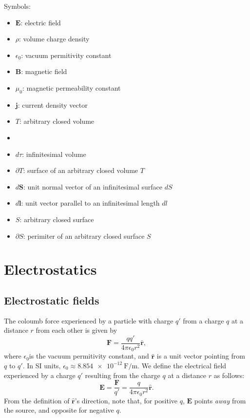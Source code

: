 \documentclass[a4paper, 12pt]{article}
\renewcommand{\vec}[1]{\mathbf{#1}}
\newcommand{\E}{\ensuremath{\vec{E}}}
\newcommand{\e}{\ensuremath{\epsilon_0}}
\renewcommand{\j}{\ensuremath{\vec{j}}}
\newcommand{\B}{\ensuremath{\vec{B}}}
\let\tmp\hat
\renewcommand{\hat}[1]{\vec{\tmp{#1}}}
\begin{document}
        Symbols:
        \begin{itemize}
            \setlength\itemsep{.1em}
            \item \E: electric field 
            \item $\rho$: volume charge density
            \item \e: vacuum permitivity constant
            \item \B: magnetic field
            \item $\mu_0$: magnetic permeability constant
            \item \j: current density vector
            \item $T$: arbitrary closed volume
            \item \item $d\tau$: infinitesimal volume
            \item $\partial T$: surface of an arbitrary closed volume $T$
            \item $d\vec{S}$: unit normal vector of an infinitesimal surface $dS$
            \item $d\vec{l}$: unit vector parallel to an infinitesimal length $dl$
            \item $S$: arbitrary closed surface
            \item $\partial S$: perimiter of an arbitrary closed surface $S$
        \end{itemize}


\section{Electrostatics}
\subsection{Electrostatic fields}
    The coloumb force experienced by a particle with charge $q'$ from a charge $q$ at a distance $r$ from each other is given by 
    \begin{equation}
        \vec{F} = \frac{qq'}{4\pi\e r^2}\hat{r},
    \end{equation}
    where \e is the vacuum permitivity constant, and $\hat{r}$ is a unit vector pointing from $q$ to $q'$. 
    In SI units, $\e \approx \SI{8.854e-12}{\farad \per \metre}$.
    We define the electrical field experienced by a charge $q'$ resulting from the charge $q$ at a distance $r$ as follows:
    \begin{equation}
        \E = \frac{\vec{F}}{q'} = \frac{q}{4\pi\e r^2}\hat{r}.
    \end{equation}
    From the definition of $\hat{r}$'s direction, note that, for positive $q$, 
    \E{} points \textit{away} from the source, and opposite for negative $q$.
    
\end{document}
